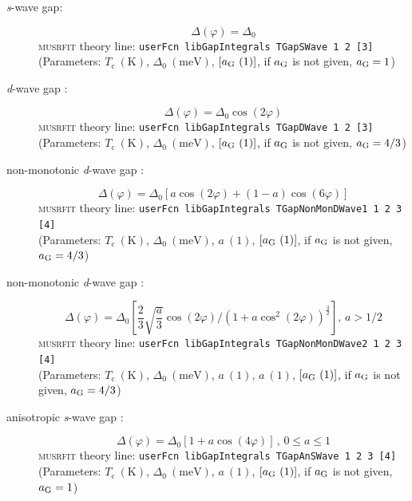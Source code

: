 \documentclass[twoside]{article}
\newcommand{\musrfit}{\textsc{musrfit}\xspace}
\begin{document}
\begin{description}
 \item[\textit{s}-wave gap:]
   \begin{equation}
     \Delta(\varphi) = \Delta_0
   \end{equation}
   \musrfit theory line: \verb?userFcn libGapIntegrals TGapSWave 1 2 [3]?\\
   (Parameters: $T_{\mathrm c}~(\mathrm{K})$, $\Delta_0~(\mathrm{meV})$, $[a_{\rm G}~(1)]$, if $a_{\rm G}$ is not given, $a_{\rm G} = 1$)
 \item[\textit{d}-wave gap \cite{Deutscher}:] 
   \begin{equation}
     \Delta(\varphi) = \Delta_0\cos\left(2\varphi\right)
   \end{equation}
   \musrfit theory line: \verb?userFcn libGapIntegrals TGapDWave 1 2 [3]?\\
   (Parameters: $T_{\mathrm c}~(\mathrm{K})$, $\Delta_0~(\mathrm{meV})$, $[a_{\rm G}~(1)]$, if $a_{\rm G}$ is not given, $a_{\rm G} = 4/3$)
 \item[non-monotonic \textit{d}-wave gap \cite{Matsui}:] 
   \begin{equation}
     \Delta(\varphi) = \Delta_0\left[a \cos\left(2\varphi\right) + (1-a)\cos\left(6\varphi\right)\right]
   \end{equation}
    \musrfit theory line: \verb?userFcn libGapIntegrals TGapNonMonDWave1 1 2 3 [4]?\\
    (Parameters: $T_{\mathrm c}~(\mathrm{K})$, $\Delta_0~(\mathrm{meV})$, $a~(1)$, $[a_{\rm G}~(1)]$, if $a_{\rm G}$ is not given, $a_{\rm G} = 4/3$)
 \item[non-monotonic \textit{d}-wave gap \cite{Eremin}:]
    \begin{equation}
      \Delta(\varphi) = \Delta_0\left[\frac{2}{3} \sqrt{\frac{a}{3}}\cos\left(2\varphi\right) / \left( 1 + a\cos^2\left(2\varphi\right)\right)^{\frac{3}{2}}\right],\,a>1/2
    \end{equation}
    \musrfit theory line: \verb?userFcn libGapIntegrals TGapNonMonDWave2 1 2 3 [4]?\\
    (Parameters: $T_{\mathrm c}~(\mathrm{K})$, $\Delta_0~(\mathrm{meV})$, $a~(1)$, $a~(1)$, $[a_{\rm G}~(1)]$, if $a_{\rm G}$ is not given, $a_{\rm G} = 4/3$)
 \item[anisotropic \textit{s}-wave gap \cite{AnisotropicSWave}:] 
    \begin{equation}
      \Delta(\varphi) = \Delta_0\left[1+a\cos\left(4\varphi\right)\right]\,,\,0\leqslant a\leqslant1
    \end{equation}
    \musrfit theory line: \verb?userFcn libGapIntegrals TGapAnSWave 1 2 3 [4]?\\
    (Parameters: $T_{\mathrm c}~(\mathrm{K})$, $\Delta_0~(\mathrm{meV})$, $a~(1)$, $[a_{\rm G}~(1)]$, if $a_{\rm G}$ is not given, $a_{\rm G} = 1$)
\end{description}
\end{document}
